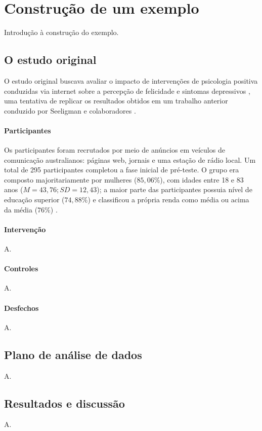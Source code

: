 \section{Construção de um exemplo}

Introdução à construção do exemplo.

\subsection{O estudo original}

O estudo original buscava avaliar o impacto de intervenções de psicologia positiva conduzidas via internet sobre a percepção de felicidade e
sintomas depressivos \cite{Woodworth2017}, uma tentativa de replicar os resultados obtidos em um trabalho anterior conduzido por Seeligman e
colaboradores \cite{Seligman2005}.

\paragraph{Participantes}

Os participantes foram recrutados por meio de anúncios em veículos de comunicação australianos: páginas web, jornais e uma estação de rádio
local. Um total de 295 participantes completou a fase inicial de pré-teste. O grupo era composto majoritariamente por mulheres ($85,06\%$),
com idades entre 18 e 83 anos ($M=43,76; SD=12,43$); a maior parte das participantes possuia nível de educação superior ($74,88\%$) e classificou
a própria renda como média ou acima da média ($76\%$) \cite{Woodworth2017, Collins2023}.

\paragraph{Intervenção}

A.

\paragraph{Controles}

A.

\paragraph{Desfechos}

A.

\subsection{Plano de análise de dados}

A.

\subsection{Resultados e discussão}

A.

